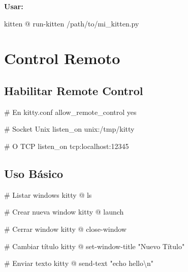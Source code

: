 \documentclass[
  doc,
  floatsintext,
  longtable,
  a4paper,
  nolmodern,
  notxfonts,
  notimes,
  12pt,
  colorlinks=true,linkcolor=blue,citecolor=blue,urlcolor=blue]{apa7}
\newenvironment{Shaded}{\begin{snugshade}}{\end{snugshade}}
\newcommand{\CommentTok}[1]{\textcolor[rgb]{0.37,0.37,0.37}{#1}}
\newcommand{\DataTypeTok}[1]{\textcolor[rgb]{0.68,0.00,0.00}{#1}}
\newcommand{\ErrorTok}[1]{\textcolor[rgb]{0.68,0.00,0.00}{#1}}
\newcommand{\ExtensionTok}[1]{\textcolor[rgb]{0.00,0.23,0.31}{#1}}
\newcommand{\NormalTok}[1]{\textcolor[rgb]{0.00,0.23,0.31}{#1}}
\newcommand{\StringTok}[1]{\textcolor[rgb]{0.13,0.47,0.30}{#1}}
\begin{document}
\textbf{Usar:}

\begin{Shaded}
\begin{Highlighting}[]
\ExtensionTok{kitten}\NormalTok{ @ run{-}kitten /path/to/mi\_kitten.py}
\end{Highlighting}
\end{Shaded}

\section{Control Remoto}\label{control-remoto}

\subsection{Habilitar Remote Control}\label{habilitar-remote-control}

\begin{Shaded}
\begin{Highlighting}[]
\CommentTok{\# En kitty.conf}
\DataTypeTok{allow\_remote\_control} \DataTypeTok{yes}

\CommentTok{\# Socket Unix}
\DataTypeTok{listen\_on} \DataTypeTok{unix}\ErrorTok{:/}\DataTypeTok{tmp}\ErrorTok{/}\DataTypeTok{kitty}

\CommentTok{\# O TCP}
\DataTypeTok{listen\_on} \DataTypeTok{tcp}\ErrorTok{:}\DataTypeTok{localhost}\ErrorTok{:}\DataTypeTok{12345}
\end{Highlighting}
\end{Shaded}

\subsection{Uso Básico}\label{uso-buxe1sico}

\begin{Shaded}
\begin{Highlighting}[]
\CommentTok{\# Listar windows}
\ExtensionTok{kitty}\NormalTok{ @ ls}

\CommentTok{\# Crear nueva window}
\ExtensionTok{kitty}\NormalTok{ @ launch}

\CommentTok{\# Cerrar window}
\ExtensionTok{kitty}\NormalTok{ @ close{-}window}

\CommentTok{\# Cambiar título}
\ExtensionTok{kitty}\NormalTok{ @ set{-}window{-}title }\StringTok{"Nuevo Título"}

\CommentTok{\# Enviar texto}
\ExtensionTok{kitty}\NormalTok{ @ send{-}text }\StringTok{"echo hello\textbackslash{}n"}
\end{Highlighting}
\end{Shaded}
\end{document}

